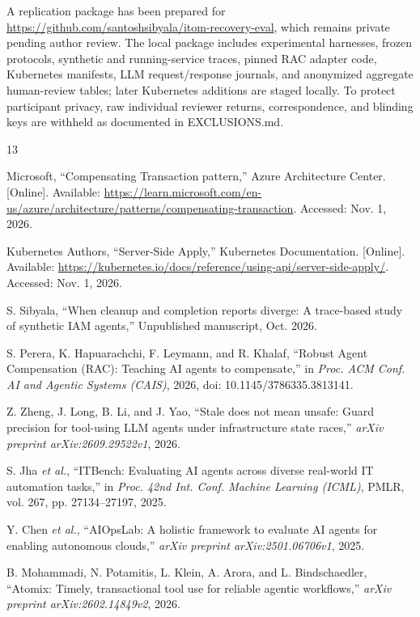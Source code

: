 \documentclass[conference,10pt]{IEEEtran}
\begin{document}
A replication package has been prepared for \url{https://github.com/santoshsibyala/itom-recovery-eval}, which remains private pending author review. The local package includes experimental harnesses, frozen protocols, synthetic and running\hyp{}service traces, pinned RAC adapter code, Kubernetes manifests, LLM request/response journals, and anonymized aggregate human\hyp{}review tables; later Kubernetes additions are staged locally. To protect participant privacy, raw individual reviewer returns, correspondence, and blinding keys are withheld as documented in EXCLUSIONS.md.

\begin{thebibliography}{13}

Microsoft, ``Compensating Transaction pattern,'' Azure Architecture Center. [Online]. Available: \url{https://learn.microsoft.com/en-us/azure/architecture/patterns/compensating-transaction}. Accessed: Nov. 1, 2026.

Kubernetes Authors, ``Server\hyp{}Side Apply,'' Kubernetes Documentation. [Online]. Available: \url{https://kubernetes.io/docs/reference/using-api/server-side-apply/}. Accessed: Nov. 1, 2026.

S. Sibyala, ``When cleanup and completion reports diverge: A trace\hyp{}based study of synthetic IAM agents,'' Unpublished manuscript, Oct. 2026.

S. Perera, K. Hapuarachchi, F. Leymann, and R. Khalaf, ``Robust Agent Compensation (RAC): Teaching AI agents to compensate,'' in \emph{Proc. ACM Conf. AI and Agentic Systems (CAIS)}, 2026, doi: 10.1145/3786335.3813141.

Z. Zheng, J. Long, B. Li, and J. Yao, ``Stale does not mean unsafe: Guard precision for tool\hyp{}using LLM agents under infrastructure state races,'' \emph{arXiv preprint arXiv:2609.29522v1}, 2026.

S. Jha \emph{et al.}, ``ITBench: Evaluating AI agents across diverse real\hyp{}world IT automation tasks,'' in \emph{Proc. 42nd Int. Conf. Machine Learning (ICML)}, PMLR, vol. 267, pp. 27134--27197, 2025.

Y. Chen \emph{et al.}, ``AIOpsLab: A holistic framework to evaluate AI agents for enabling autonomous clouds,'' \emph{arXiv preprint arXiv:2501.06706v1}, 2025.

B. Mohammadi, N. Potamitis, L. Klein, A. Arora, and L. Bindschaedler, ``Atomix: Timely, transactional tool use for reliable agentic workflows,'' \emph{arXiv preprint arXiv:2602.14849v2}, 2026.


\end{thebibliography}
\end{document}
